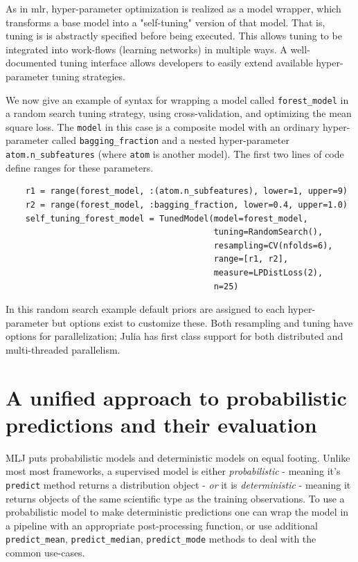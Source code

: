 \documentclass{article}
\begin{document}
As in mlr, hyper-parameter optimization is realized as a model
wrapper, which transforms a base model into a "self-tuning" version of
that model. That is, tuning is is abstractly specified before being
executed. This allows tuning to be integrated into work-flows
(learning networks) in multiple ways. A well-documented tuning
interface \cite{MLJTuning} allows developers to easily extend
available hyper-parameter tuning strategies.

We now give an example of syntax for wrapping a model called
\texttt{forest\_model} in a random search tuning strategy, using
cross-validation, and optimizing the mean square loss. The
\texttt{model} in this case is a composite model with an ordinary
hyper-parameter called \texttt{bagging\_fraction} and a nested
hyper-parameter \texttt{atom.n\_subfeatures} (where \texttt{atom} is
another model). The first two lines of code define ranges for these
parameters.

{\small
\begin{verbatim}
    r1 = range(forest_model, :(atom.n_subfeatures), lower=1, upper=9)
    r2 = range(forest_model, :bagging_fraction, lower=0.4, upper=1.0)
    self_tuning_forest_model = TunedModel(model=forest_model,
                                          tuning=RandomSearch(),
                                          resampling=CV(nfolds=6),
                                          range=[r1, r2],
                                          measure=LPDistLoss(2),
                                          n=25)
\end{verbatim}
}

In this random search example default priors are assigned to each
hyper-parameter but options exist to customize these. Both resampling
and tuning have options for parallelization; Julia has first class
support for both distributed and multi-threaded parallelism.

\section{A unified approach to probabilistic predictions and their
  evaluation}

MLJ puts probabilistic models and deterministic models on equal
footing. Unlike most most frameworks, a supervised model is either
\textit{probabilistic} - meaning it's \texttt{predict} method returns a
distribution object - \textit{or} it is \textit{deterministic} -
meaning it returns objects of the same scientific type as the training
observations. To use a probabilistic model to make deterministic
predictions one can wrap the model in a pipeline with an appropriate
post-processing function, or use additional \texttt{predict\_mean},
\texttt{predict\_median}, \texttt{predict\_mode} methods to deal with
the common use-cases.
\end{document}
